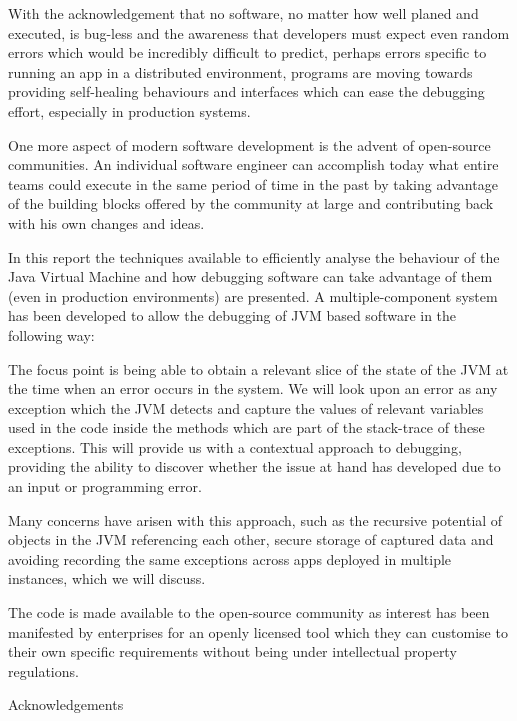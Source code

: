 \documentclass[12pt]{article}
\begin{document}
With the acknowledgement that no software, no matter how well planed and executed, is bug-less and the awareness that developers must expect even random errors which would be incredibly difficult to predict, perhaps errors specific to running an app in a distributed environment, programs are moving towards providing self-healing behaviours and interfaces which can ease the debugging effort, especially in production systems.

One more aspect of modern software development is the advent of open-source communities. An individual software engineer can accomplish today what entire teams could execute in the same period of time in the past by taking advantage of the building blocks offered by the community at large and contributing back with his own changes and ideas. 

In this report the techniques available to efficiently analyse the behaviour of the Java Virtual Machine and how debugging software can take advantage of them (even in production environments) are presented. A multiple-component system has been developed to allow the debugging of JVM based software in the following way:

The focus point is being able to obtain a relevant slice of the state of the JVM at the time when an error occurs in the system. We will look upon an error as any exception which the JVM detects and capture the values of relevant variables used in the code inside the methods which are part of the stack-trace of these exceptions. This will provide us with a contextual approach to debugging, providing the ability to discover whether the issue at hand has developed due to an input or programming error.

Many concerns have arisen with this approach, such as the recursive potential of objects in the JVM referencing each other, secure storage of captured data and avoiding recording the same exceptions across apps deployed in multiple instances, which we will discuss.

The code is made available to the open-source community as interest has been manifested by enterprises for an openly licensed tool which they can customise to their own specific requirements without being under intellectual property regulations.

\newpage

\begin{center} {\LARGE Acknowledgements} \end{center}

~\\
~\\
\end{document}
